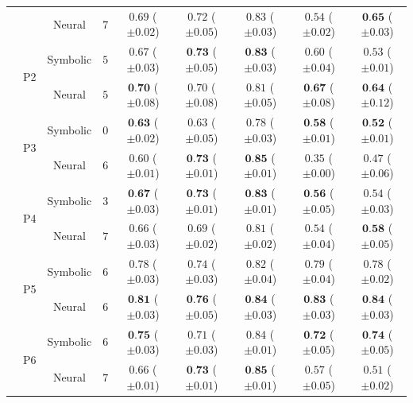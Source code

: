 \begin{table}[!t]
\begin{tabular}{ccccccccc}
		&  & Neural & $7$ & $0.69 $ {\tiny ($\pm 0.02$)} & $0.72 $ {\tiny ($\pm 0.05$)} & $0.83 $ {\tiny ($\pm 0.03$)} & $0.54 $ {\tiny ($\pm 0.02$)} & $\textbf{0.65} $ {\tiny ($\pm 0.03$)}\\
		\cmidrule{2-9}
		& \multirow{2}{*}{P2} & Symbolic & $5$ & $0.67 $ {\tiny ($\pm 0.03$)} & $\textbf{0.73} $ {\tiny ($\pm 0.05$)} & $\textbf{0.83} $ {\tiny ($\pm 0.03$)} & $0.60 $ {\tiny ($\pm 0.04$)} & $0.53 $ {\tiny ($\pm 0.01$)}\\
		&  & Neural & $5$ & $\textbf{0.70} $ {\tiny ($\pm 0.08$)} & $0.70 $ {\tiny ($\pm 0.08$)} & $0.81 $ {\tiny ($\pm 0.05$)} & $\textbf{0.67} $ {\tiny ($\pm 0.08$)} & $\textbf{0.64} $ {\tiny ($\pm 0.12$)}\\
		\cmidrule{2-9}
		& \multirow{2}{*}{P3} & Symbolic & $0$ & $\textbf{0.63} $ {\tiny ($\pm 0.02$)} & $0.63 $ {\tiny ($\pm 0.05$)} & $0.78 $ {\tiny ($\pm 0.03$)} & $\textbf{0.58} $ {\tiny ($\pm 0.01$)} & $\textbf{0.52} $ {\tiny ($\pm 0.01$)}\\
		&  & Neural & $6$ & $0.60 $ {\tiny ($\pm 0.01$)} & $\textbf{0.73} $ {\tiny ($\pm 0.01$)} & $\textbf{0.85} $ {\tiny ($\pm 0.01$)} & $0.35 $ {\tiny ($\pm 0.00$)} & $0.47 $ {\tiny ($\pm 0.06$)}\\
		\cmidrule{2-9}
		& \multirow{2}{*}{P4} & Symbolic & $3$ & $\textbf{0.67} $ {\tiny ($\pm 0.03$)} & $\textbf{0.73} $ {\tiny ($\pm 0.01$)} & $\textbf{0.83} $ {\tiny ($\pm 0.01$)} & $\textbf{0.56} $ {\tiny ($\pm 0.05$)} & $0.54 $ {\tiny ($\pm 0.03$)}\\
		&  & Neural & $7$ & $0.66 $ {\tiny ($\pm 0.03$)} & $0.69 $ {\tiny ($\pm 0.02$)} & $0.81 $ {\tiny ($\pm 0.02$)} & $0.54 $ {\tiny ($\pm 0.04$)} & $\textbf{0.58} $ {\tiny ($\pm 0.05$)}\\
		\cmidrule{2-9}
		& \multirow{2}{*}{P5} & Symbolic & $6$ & $0.78 $ {\tiny ($\pm 0.03$)} & $0.74 $ {\tiny ($\pm 0.03$)} & $0.82 $ {\tiny ($\pm 0.04$)} & $0.79 $ {\tiny ($\pm 0.04$)} & $0.78 $ {\tiny ($\pm 0.02$)}\\
		&  & Neural & $6$ & $\textbf{0.81} $ {\tiny ($\pm 0.03$)} & $\textbf{0.76} $ {\tiny ($\pm 0.05$)} & $\textbf{0.84} $ {\tiny ($\pm 0.03$)} & $\textbf{0.83} $ {\tiny ($\pm 0.03$)} & $\textbf{0.84} $ {\tiny ($\pm 0.03$)}\\
		\cmidrule{2-9}
		& \multirow{2}{*}{P6} & Symbolic & $6$ & $\textbf{0.75} $ {\tiny ($\pm 0.03$)} & $0.71 $ {\tiny ($\pm 0.03$)} & $0.84 $ {\tiny ($\pm 0.01$)} & $\textbf{0.72} $ {\tiny ($\pm 0.05$)} & $\textbf{0.74} $ {\tiny ($\pm 0.05$)}\\
		&  & Neural & $7$ & $0.66 $ {\tiny ($\pm 0.01$)} & $\textbf{0.73} $ {\tiny ($\pm 0.01$)} & $\textbf{0.85} $ {\tiny ($\pm 0.01$)} & $0.57 $ {\tiny ($\pm 0.05$)} & $0.51 $ {\tiny ($\pm 0.02$)}\\

\end{tabular}
\end{table}
